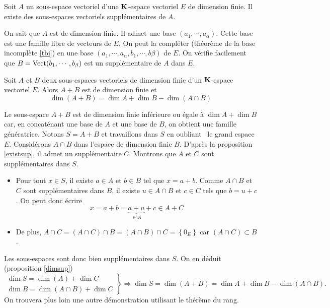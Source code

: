 \begin{propn}\label{existsup}
Soit $A$ un sous-espace vectoriel d'une $\mathbf{K}$-espace vectoriel $E$ de dimension finie. Il existe des sous-espaces vectoriels supplémentaires de $A$. 
\end{propn}
\begin{demo}
On sait que $A$ est de dimension finie. Il admet une base $(a_1,\cdots,a_\alpha)$. Cette base est une famille libre de vecteurs de $E$. On peut la compléter (théorème de la base incomplète \ref{tbi}) en une base $(a_1,\cdots,a_\alpha,b_1,\cdots,b\beta)$ de $E$. On vérifie facilement que $B=\mathop{\mathrm{Vect}}(b_1,\cdots,b_{\beta})$ est un supplémentaire de $A$ dans $E$.
\end{demo}

\begin{prop}\label{fgrass}
  Soit $A$ et $B$ deux sous-espaces vectoriels de dimension finie d'un $\mathbf{K}$-espace vectoriel $E$. Alors $A+B$ est de dimension finie et
\begin{displaymath}
  \dim(A + B) = \dim A + \dim B - \dim(A\cap B)
\end{displaymath}
\end{prop}
\begin{demo}
Le sous-espace $A+B$ est de dimension finie inférieure ou égale à $\dim A + \dim B$ car, en concaténant une base de $A$ et une base de $B$, on obtient une famille génératrice. Notons $S=A+B$ et travaillons dans $S$ en \og oubliant\fg~ le grand espace $E$.\newline
Considérons $A\cap B$ dans l'espace de dimension finie $B$. D'après la proposition \ref{existsup}, il admet un supplémentaire $C$. Montrons que $A$ et $C$ sont supplémentaires dans $S$.
\begin{itemize}
  \item Pour tout $x\in S$, il existe $a\in A$ et $b\in B$ tel que $x=a+b$. Comme $A\cap B$ et $C$ sont supplémentaires dans $B$, il existe $u\in A\cap B$ et $c\in C$ tels que $b = u + c$. On peut donc écrire
\begin{displaymath}
  x = a +b = \underset{\in A}{\underbrace{a+u}} + c \in A + C
\end{displaymath}
\item De plus, $A\cap C = (A\cap C)\cap B = (A\cap B) \cap C = \left\lbrace 0_E\right\rbrace$ car $(A\cap C)\subset B$. 
\end{itemize}
Les sous-espaces sont donc bien supplémentaires dans $S$. On en déduit (proposition \ref{dimsup})
\begin{displaymath}
\left. 
\begin{aligned}
  \dim S = \dim(A) + \dim C \\
  \dim B = \dim(A\cap B) + \dim C
\end{aligned}\right\rbrace  \Rightarrow \dim S = \dim (A+B) = \dim A + \dim B - \dim(A\cap B).
\end{displaymath}
On trouvera plus loin une autre démonstration utilisant le thérème du rang. 
\end{demo}

